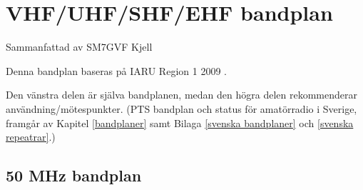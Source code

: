 \section{VHF/UHF/SHF/EHF bandplan}

Sammanfattad av SM7GVF Kjell

Denna bandplan baseras på IARU Region 1 2009 \cite{IARU1}.

Den vänstra delen är själva bandplanen, medan den högra delen rekommenderar användning/mötespunkter.
(PTS bandplan och status för amatörradio i Sverige, framgår av Kapitel \ref{bandplaner} samt Bilaga \ref{svenska bandplaner} och \ref{svenska repeatrar}.)

\subsection{50 MHz bandplan}


